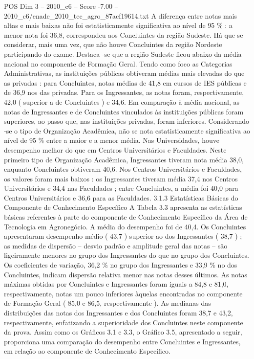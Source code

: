 \begin{textsample}{POS Dim 3 – 2010\_c6 – Score -7.00 – 2010\_c6/enade\_2010\_tec\_agro\_87acf19614.txt}
A diferença entre notas mais altas e mais baixas não foi estatisticamente significativa ao nível de 95 \% : a menor nota foi 36,8, correspondeu aos Concluintes da região Sudeste.
Há que se considerar, mais uma vez, que não houve Concluintes da região Nordeste participando do exame.
Destaca -se que a região Sudeste ficou abaixo da média nacional no componente de Formação Geral.
Tendo como foco as Categorias Administrativas, as instituições públicas obtiveram médias mais elevadas do que as privadas : para Concluintes, notas médias de 41,8 em cursos de IES públicas e de 36,9 nos das privadas.
Para os Ingressantes, as notas foram, respectivamente, 42,0 ( superior a de Concluintes ) e 34,6.
Em comparação à média nacional, as notas de Ingressantes e de Concluintes vinculados às instituições públicas foram superiores, ao passo que, nas instituições privadas, foram inferiores.
Considerando -se o tipo de Organização Acadêmica, não se nota estatisticamente significativa ao nível de 95 \% entre a maior e a menor média.
Nas Universidades, houve desempenho melhor do que em Centros Universitários e Faculdades.
Neste primeiro tipo de Organização Acadêmica, Ingressantes tiveram nota média 38,0, enquanto Concluintes obtiveram 40,6.
Nos Centros Universitários e Faculdades, os valores foram mais baixos : os Ingressantes tiveram média 37,4 nos Centros Universitários e 34,4 nas Faculdades ; entre Concluintes, a média foi 40,0 para Centros Universitários e 36,6 para as Faculdades. 3.1.3 Estatísticas Básicas do Componente de Conhecimento Específico A Tabela 3.3 apresenta as estatísticas básicas referentes à parte do componente de Conhecimento Específico da Área de Tecnologia em Agronegócio.
A média do desempenho foi de 40,4.
Os Concluintes apresentaram desempenho médio ( 43,7 ) superior ao dos Ingressantes ( 38,7 ) ; as medidas de dispersão – desvio padrão e amplitude geral das notas – são ligeiramente menores no grupo dos Ingressantes do que no grupo dos Concluintes.
Os coeficientes de variação, 36,2 \% no grupo dos Ingressantes e 33,9 \% no dos Concluintes, indicam dispersão relativa menor nas notas desses últimos.
As notas máximas obtidas por Concluintes e Ingressantes foram iguais a 84,8 e 81,0, respectivamente, notas um pouco inferiores àquelas encontradas no componente de Formação Geral ( 85,0 e 86,5, respectivamente ).
As medianas das distribuições das notas dos Ingressantes e dos Concluintes foram 38,7 e 43,2, respectivamente, enfatizando a superioridade dos Concluintes neste componente da prova.
Assim como os Gráficos 3.1 e 3.3, o Gráfico 3.5, apresentado a seguir, proporciona uma comparação do desempenho entre Concluintes e Ingressantes, em relação ao componente de Conhecimento Específico.

\end{textsample}
